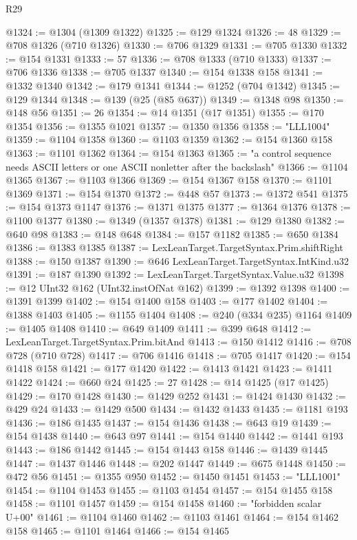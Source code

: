 \begin{lexlean}{R29}
\begin{coremodule}
@1324 := @1304 (@1309 @1322)
@1325 := @129 @1324
@1326 := 48
@1329 := @708 @1326 (@710 @1326)
@1330 := @706 @1329
@1331 := @705 @1330
@1332 := @154 @1331
@1333 := 57
@1336 := @708 @1333 (@710 @1333)
@1337 := @706 @1336
@1338 := @705 @1337
@1340 := @154 @1338 @158
@1341 := @1332 @1340
@1342 := @179 @1341
@1344 := @1252 (@704 @1342)
@1345 := @129 @1344
@1348 := @139 (@25 (@85 @637))
@1349 := @1348 @98
@1350 := @148 @56
@1351 := 26
@1354 := @14 @1351 (@17 @1351)
@1355 := @170 @1354
@1356 := @1355 @1021
@1357 := @1350 @1356
@1358 := "LLL1004"
@1359 := @1104 @1358
@1360 := @1103 @1359
@1362 := @154 @1360 @158
@1363 := @1101 @1362
@1364 := @154 @1363
@1365 := "a control sequence needs ASCII letters or one ASCII nonletter after the backslash"
@1366 := @1104 @1365
@1367 := @1103 @1366
@1369 := @154 @1367 @158
@1370 := @1101 @1369
@1371 := @154 @1370
@1372 := @448 @57
@1373 := @1372 @541
@1375 := @154 @1373 @1147
@1376 := @1371 @1375
@1377 := @1364 @1376
@1378 := @1100 @1377
@1380 := @1349 (@1357 @1378)
@1381 := @129 @1380
@1382 := @640 @98
@1383 := @148 @648
@1384 := @157 @1182
@1385 := @650 @1384
@1386 := @1383 @1385
@1387 := LexLeanTarget.TargetSyntax.Prim.shiftRight
@1388 := @150 @1387
@1390 := @646 LexLeanTarget.TargetSyntax.IntKind.u32
@1391 := @187 @1390
@1392 := LexLeanTarget.TargetSyntax.Value.u32
@1398 := @12 UInt32 @162 (UInt32.instOfNat @162)
@1399 := @1392 @1398
@1400 := @1391 @1399
@1402 := @154 @1400 @158
@1403 := @177 @1402
@1404 := @1388 @1403
@1405 := @1155 @1404
@1408 := @240 (@334 @235) @1164
@1409 := @1405 @1408
@1410 := @649 @1409
@1411 := @399 @648
@1412 := LexLeanTarget.TargetSyntax.Prim.bitAnd
@1413 := @150 @1412
@1416 := @708 @728 (@710 @728)
@1417 := @706 @1416
@1418 := @705 @1417
@1420 := @154 @1418 @158
@1421 := @177 @1420
@1422 := @1413 @1421
@1423 := @1411 @1422
@1424 := @660 @24
@1425 := 27
@1428 := @14 @1425 (@17 @1425)
@1429 := @170 @1428
@1430 := @1429 @252
@1431 := @1424 @1430
@1432 := @429 @24
@1433 := @1429 @500
@1434 := @1432 @1433
@1435 := @1181 @193
@1436 := @186 @1435
@1437 := @154 @1436
@1438 := @643 @19
@1439 := @154 @1438
@1440 := @643 @97
@1441 := @154 @1440
@1442 := @1441 @193
@1443 := @186 @1442
@1445 := @154 @1443 @158
@1446 := @1439 @1445
@1447 := @1437 @1446
@1448 := @202 @1447
@1449 := @675 @1448
@1450 := @472 @56
@1451 := @1355 @950
@1452 := @1450 @1451
@1453 := "LLL1001"
@1454 := @1104 @1453
@1455 := @1103 @1454
@1457 := @154 @1455 @158
@1458 := @1101 @1457
@1459 := @154 @1458
@1460 := "forbidden scalar U+00"
@1461 := @1104 @1460
@1462 := @1103 @1461
@1464 := @154 @1462 @158
@1465 := @1101 @1464
@1466 := @154 @1465

\end{coremodule}
\end{lexlean}
